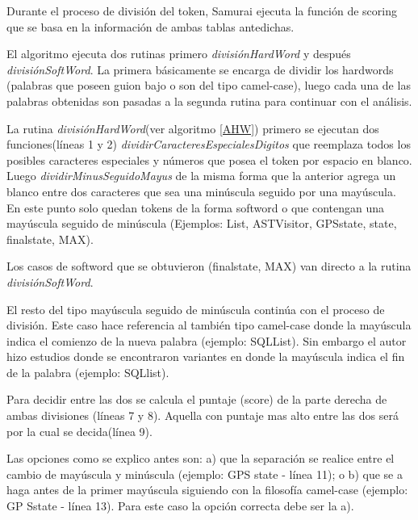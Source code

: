 \documentclass[a4paper,12pt]{report}
\begin{document}
Durante el proceso de división del token, Samurai ejecuta la función de scoring que se basa en la información de ambas tablas antedichas.


El algoritmo ejecuta dos rutinas primero \textit{divisiónHardWord} y después \mbox{\textit{divisiónSoftWord}}. La primera básicamente se encarga de dividir los hardwords (palabras que poseen guion bajo o son del tipo camel-case), luego cada una de las palabras obtenidas son pasadas a la segunda rutina para continuar con el análisis.

La rutina \textit{divisiónHardWord}(ver algoritmo \ref{AHW}) primero se ejecutan dos funciones(líneas 1 y 2) \textit{dividirCaracteresEspecialesDigitos} que reemplaza todos los posibles caracteres especiales y números que posea el token por espacio en blanco. Luego \mbox{\textit{dividirMinusSeguidoMayus}} de la misma forma que la anterior agrega un blanco entre dos caracteres que sea una minúscula seguido por una mayúscula. En este punto solo quedan tokens de la forma softword o que contengan una mayúscula seguido de minúscula (Ejemplos: \textsf{List, ASTVisitor, GPSstate, state, finalstate, MAX}).

Los casos de softword que se obtuvieron (\textsf{finalstate}, \textsf{MAX}) van directo a la rutina \mbox{\textit{divisiónSoftWord}}. 

El resto del tipo mayúscula seguido de minúscula continúa con el proceso de división. Este caso hace referencia al también tipo camel-case donde la mayúscula indica el comienzo de la nueva palabra (ejemplo: \textsf{SQLList}). Sin embargo el autor hizo estudios donde se encontraron variantes en donde la mayúscula indica el fin de la palabra (ejemplo: \textsf{SQLlist}).
 
Para decidir entre las dos se calcula el puntaje (score) de la parte derecha de ambas divisiones (líneas 7 y 8). Aquella con puntaje mas alto entre las dos será por la cual se decida(línea 9). 

Las opciones como se explico antes son: a) que la separación se realice entre el cambio de mayúscula y minúscula (ejemplo: \textsf{GPS state} - línea 11); o b) que se a haga antes de la primer mayúscula siguiendo con la filosofía camel-case (ejemplo: \textsf{GP Sstate} - línea 13). Para este caso la opción correcta debe ser la a).
\end{document}

